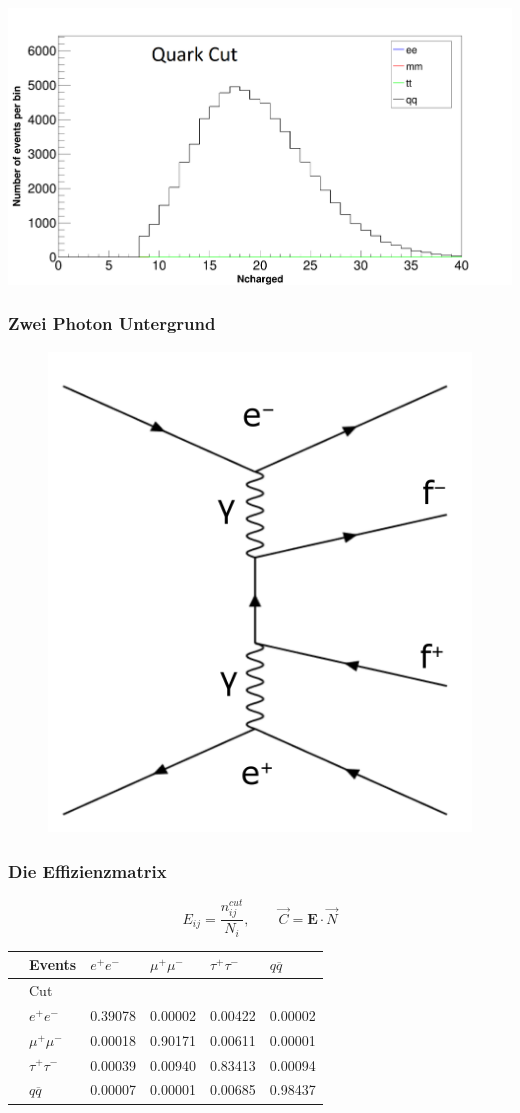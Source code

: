 \begin{frame}
\begin{minipage}{0.48\linewidth}
			\includegraphics[width=1.1\linewidth]{graphics/Ncharged_vergleich_qq}
		\end{minipage}
\end{frame}

\begin{frame}
	\frametitle{Zwei Photon Untergrund}
	\begin{figure}
		\centering
		\includegraphics[width=0.55\linewidth]{graphics/twophotonfeynman}
	\end{figure}
\end{frame}


\begin{frame}
	\frametitle{Die Effizienzmatrix}
	\begin{equation*}
	E_{ij}=\frac{n^{cut}_{ij}}{N_i},\qquad \vec{C}=\boldsymbol{E}\cdot\vec{N}
	\end{equation*}
	\begin{table}[H]\centering
		\begin{tabular}{@{}llllll@{}}
			\toprule
			&Events &$e^+e^-$&$\mu^+\mu^-$&$\tau^+\tau^-$&$q\overline{q}$\\
			\midrule
			&Cut&&&&\\
			&$e^+e^-$&0.39078&0.00002&0.00422&0.00002\\
			&$\mu^+\mu^-$&0.00018&0.90171&0.00611&0.00001\\
			&$\tau^+\tau^-$&0.00039&0.00940&0.83413&0.00094\\
			&$q\overline{q}$&0.00007&0.00001&0.00685&0.98437\\
		\end{tabular}\\
		\noindent{}
	\end{table}
\end{frame}

